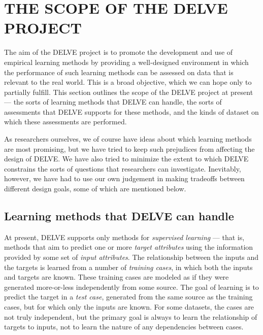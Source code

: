 %
%
\newpage

\section{THE SCOPE OF THE DELVE PROJECT}\label{sec-aims}
\thispagestyle{plain}
\setcounter{figure}{0}

The aim of the DELVE project is to promote the development and use of
empirical learning methods by providing a well-designed environment in
which the performance of such learning methods can be assessed on data
that is relevant to the real world.  This is a broad objective, which
we can hope only to partially fulfill.  This section outlines the
scope of the DELVE project at present --- the sorts of learning
methods that DELVE can handle, the sorts of assessments that DELVE
supports for these methods, and the kinds of dataset on which these
assessments are performed.

As researchers ourselves, we of course have ideas about which learning
methods are most promising, but we have tried to keep such prejudices
from affecting the design of DELVE.  We have also tried to minimize
the extent to which DELVE constrains the sorts of questions that
researchers can investigate.  Inevitably, however, we have had to use
our own judgement in making tradeoffs between different design goals,
some of which are mentioned below.


\subsection{Learning methods that DELVE can handle}\label{scope-range}

At present, DELVE supports only methods for {\em supervised
learning\/} --- that is, methods that aim to predict one or more {\em
target attributes\/} using the information provided by some set of
{\em input attributes\/}.  The relationship between the inputs and the
targets is learned from a number of {\em training cases\/}, in which
both the inputs and targets are known.  These training cases are
modeled as if they were generated more-or-less independently from some
source.  The goal of learning is to predict the target in a {\em test
case\/}, generated from the same source as the training cases, but for
which only the inputs are known.  For some datasets, the cases are not
truly independent, but the primary goal is always to learn the
relationship of targets to inputs, not to learn the nature of any
dependencies between cases.

